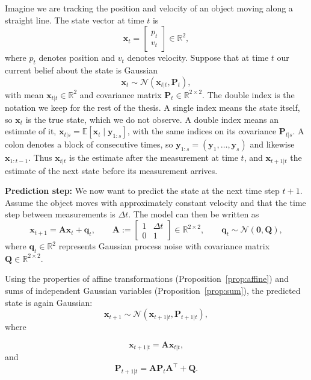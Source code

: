 \begin{example}\label{ex:tracking_1d} %
Imagine we are tracking the position and velocity of an object moving along a straight line. The state vector at time $t$ is
\[
\mathbf{x}_t =
    \begin{bmatrix}
    p_t \\
    v_t
    \end{bmatrix}
\in \mathbb{R}^2,
\]
where $p_t$ denotes position and $v_t$ denotes velocity.
Suppose that at time $t$ our current belief about the state is Gaussian
\[
\mathbf{x}_t \sim \mathcal{N}(\mathbf{x}_{t|t},\mathbf{P}_t),
\]
with mean $\mathbf{x}_{t|t} \in \mathbb{R}^2$ and covariance matrix $\mathbf{P}_t \in \mathbb{R}^{2\times2}$. The double index is the notation we keep for the rest of the thesis. A single index means the state itself, so $\mathbf{x}_t$ is the true state, which we do not observe. A double index means an estimate of it, $\mathbf{x}_{t|s} = \mathbb{E}[\mathbf{x}_t \mid \mathbf{y}_{1:s}]$, with the same indices on its covariance $\mathbf{P}_{t|s}$. A colon denotes a block of consecutive times, so $\mathbf{y}_{1:s} = (\mathbf{y}_1,\ldots,\mathbf{y}_s)$ and likewise $\mathbf{x}_{1:t-1}$. Thus $\mathbf{x}_{t|t}$ is the estimate after the measurement at time $t$, and $\mathbf{x}_{t+1|t}$ the estimate of the next state before its measurement arrives.

\textbf{Prediction step:} We now want to predict the state at the next time step $t+1$. Assume the object moves with approximately constant velocity and that the time step between measurements is $\Delta t$. The model can then be written as
\[
\mathbf{x}_{t+1}
=\mathbf{A}\mathbf{x}_t + \mathbf{q}_t,
\qquad
\mathbf{A} :=
    \begin{bmatrix}
    1 & \Delta t \\
    0 & 1
    \end{bmatrix}
\in \mathbb{R}^{2\times2},
\qquad
\mathbf{q}_t \sim \mathcal{N}(\mathbf{0},\mathbf{Q}),
\]
where $\mathbf{q}_t \in \mathbb{R}^2$ represents Gaussian process noise with covariance matrix $\mathbf{Q} \in \mathbb{R}^{2\times2}$.

Using the properties of affine transformations (Proposition~\ref{prop:affine}) and sums of independent Gaussian variables (Proposition~\ref{prop:sum}), the predicted state is again Gaussian:
\[
\mathbf{x}_{t+1} \sim \mathcal{N}(\mathbf{x}_{t+1|t},\mathbf{P}_{t+1|t}),
\]
where

\[
\mathbf{x}_{t+1|t} = \mathbf{A}\mathbf{x}_{t|t},
\]
and
\[
\mathbf{P}_{t+1|t}
=\mathbf{A}\mathbf{P}_t\mathbf{A}^\top + \mathbf{Q}.
\]


\end{example}

